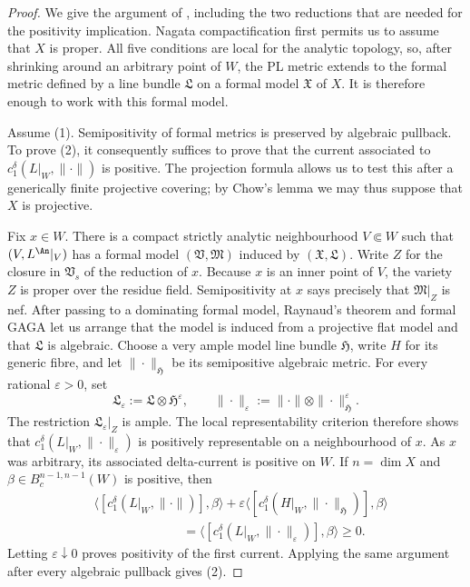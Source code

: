 \begin{proof}
We give the argument of \cite[Theorem~6.10]{GK19}, including the two
reductions that are needed for the positivity implication.  Nagata
compactification first permits us to assume that $X$ is proper.  All five
conditions are local for the analytic topology, so, after shrinking around
an arbitrary point of $W$, the PL metric extends to the formal metric defined
by a line bundle $\mathfrak L$ on a formal model $\mathfrak X$ of $X$.  It is
therefore enough to work with this formal model.

Assume (1).  Semipositivity of formal metrics is preserved by algebraic
pullback.  To prove (2), it consequently suffices to prove that the current
associated to $c_1^\delta(L|_W,\|\cdot\|)$ is positive.  The projection formula
allows us to test this after a generically finite projective covering; by
Chow's lemma we may thus suppose that $X$ is projective.

Fix $x\in W$.  There is a compact strictly analytic neighbourhood
$V\Subset W$ such that $(V,L^{\An}|_V)$ has a formal model
$(\mathfrak V,\mathfrak M)$ induced by $(\mathfrak X,\mathfrak L)$.  Write
$Z$ for the closure in $\mathfrak V_s$ of the reduction of $x$.  Because
$x$ is an inner point of $V$, the variety $Z$ is proper over the residue
field.  Semipositivity at $x$ says precisely that $\mathfrak M|_Z$ is nef.
After passing to a dominating formal model, Raynaud's theorem and formal
GAGA let us arrange that the model is induced from a projective flat model
and that $\mathfrak L$ is algebraic.  Choose a very ample model line bundle
$\mathfrak H$, write $H$ for its generic fibre, and let
$\|\cdot\|_{\mathfrak H}$ be its semipositive algebraic metric.  For every
rational $\varepsilon>0$, set
\[
 \mathfrak L_\varepsilon
   :=\mathfrak L\otimes\mathfrak H^{\varepsilon},
 \qquad
 \|\cdot\|_\varepsilon
   :=\|\cdot\|\otimes\|\cdot\|_{\mathfrak H}^{\varepsilon}.
\]
The restriction $\mathfrak L_\varepsilon|_Z$ is ample.  The local
representability criterion \cite[Lemma~6.9]{GK19} therefore shows that
$c_1^\delta(L|_W,\|\cdot\|_\varepsilon)$ is positively representable on a
neighbourhood of $x$.  As $x$ was arbitrary, its associated delta-current is
positive on $W$.  If $n=\dim X$ and
$\beta\in B_c^{n-1,n-1}(W)$ is positive, then
\begin{align*}
 &\big\langle[c_1^\delta(L|_W,\|\cdot\|)],\beta\big\rangle
 +\varepsilon
  \big\langle[c_1^\delta(H|_W,\|\cdot\|_{\mathfrak H})],\beta\big\rangle \\
 &\hspace{7em}=
 \big\langle[c_1^\delta(L|_W,\|\cdot\|_\varepsilon)],\beta\big\rangle
 \geq0 .
\end{align*}
Letting $\varepsilon\downarrow0$ proves positivity of the first current.
Applying the same argument after every algebraic pullback gives (2).


\end{proof}
